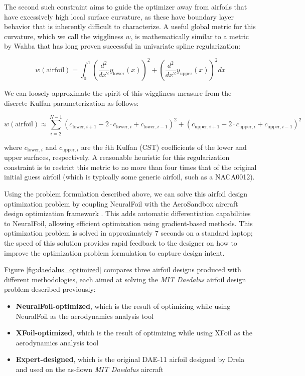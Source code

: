     The second such constraint aims to guide the optimizer away from airfoils that have excessively high local surface curvature, as these have boundary layer behavior that is inherently difficult to characterize. A useful global metric for this curvature, which we call the wiggliness $w$, is mathematically similar to a metric by Wahba \cite{wahba_spline_2007} that has long proven successful in univariate spline regularization:

    $$w(\mathrm{airfoil}) = \int_0^1 \left( \frac{d^2}{dx^2} y_\mathrm{lower}(x) \right)^2 + \left( \frac{d^2}{dx^2} y_\mathrm{upper}(x) \right)^2 dx$$

    \noindent We can loosely approximate the spirit of this wiggliness measure from the discrete Kulfan parameterization as follows:

    $$w(\mathrm{airfoil}) \approx \sum_{i=2}^{N-1} \left(c_{\mathrm{lower},i+1} - 2 \cdot c_{\mathrm{lower},i} + c_{\mathrm{lower},i-1} \right)^2 + \left(c_{\mathrm{upper},i+1} - 2 \cdot c_{\mathrm{upper},i} + c_{\mathrm{upper},i-1} \right)^2$$

    \noindent where $c_{\mathrm{lower},i}$ and $c_{\mathrm{upper},i}$ are the $i$th Kulfan (CST) coefficients of the lower and upper surfaces, respectively. A reasonable heuristic for this regularization constraint is to restrict this metric to no more than four times that of the original initial guess airfoil (which is typically some generic airfoil, such as a NACA0012).

    Using the problem formulation described above, we can solve this airfoil design optimization problem by coupling NeuralFoil with the AeroSandbox aircraft design optimization framework \cite{sharpe_aerosandbox_2021}. This adds automatic differentiation capabilities to NeuralFoil, allowing efficient optimization using gradient-based methods. This optimization problem is solved in approximately 7 seconds on a standard laptop; the speed of this solution provides rapid feedback to the designer on how to improve the optimization problem formulation to capture design intent.

    Figure \ref{fig:daedalus_optimized} compares three airfoil designs produced with different methodologies, each aimed at solving the \emph{MIT Daedalus} airfoil design problem described previously:

    \begin{itemize}
        \item \textbf{NeuralFoil-optimized}, which is the result of optimizing while using NeuralFoil as the aerodynamics analysis tool
        \item \textbf{XFoil-optimized}, which is the result of optimizing while using XFoil as the aerodynamics analysis tool
        \item \textbf{Expert-designed}, which is the original DAE-11 airfoil designed by Drela \cite{drela_lowreynoldsnumber_1988} and used on the as-flown \emph{MIT Daedalus} aircraft
    \end{itemize}

